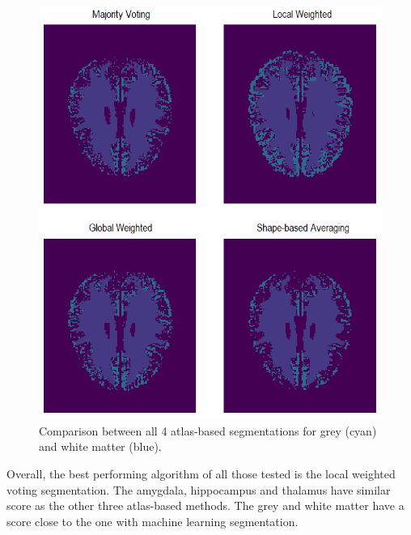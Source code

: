 \begin{figure}[h!]
	\centering
	\includegraphics[width=.88\linewidth]{img/compareSegmentationSlice}
	\caption{Comparison between all 4 atlas-based segmentations for grey (cyan) and white matter (blue).}
	\label{fig:compareSegmentationSlice}
\end{figure}

Overall, the best performing algorithm of all those tested is the local weighted voting segmentation. The amygdala, hippocampus and thalamus have similar score as the other three atlas-based methods. The grey and white matter have a score close to the one with machine learning segmentation.